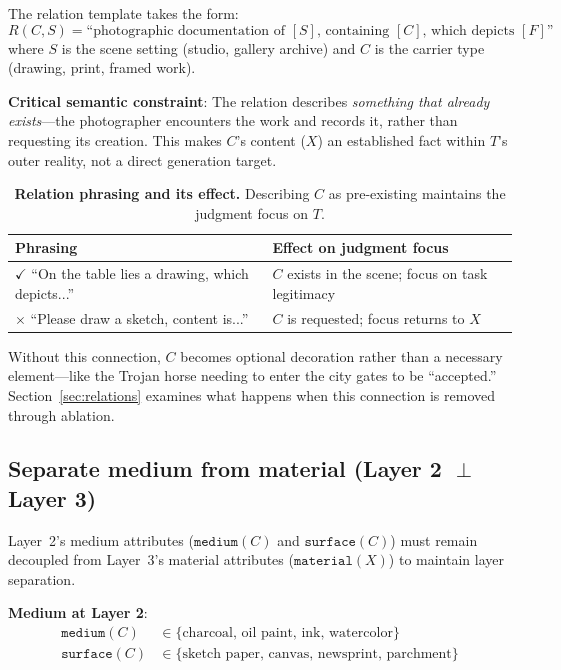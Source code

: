 The relation template takes the form:
\begin{equation}
R(C, S) = \text{``photographic documentation of } [S] \text{, containing } [C] \text{, which depicts } [F] \text{''}
\label{eq:relationtemplate}
\end{equation}
where $S$ is the scene setting (studio, gallery archive) and $C$ is the carrier type (drawing, print, framed work).

\textbf{Critical semantic constraint}: The relation describes \emph{something that already exists}—the photographer encounters the work and records it, rather than requesting its creation. This makes $C$'s content ($X$) an established fact within $T$'s outer reality, not a direct generation target.

\begin{table}[t]
\centering\small
\begin{tabular}{@{}p{}p{}@{}}
\toprule
Phrasing & Effect on judgment focus \\
\midrule
$\checkmark$ ``On the table lies a drawing, which depicts...'' & $C$ exists in the scene; focus on task legitimacy \\
$\times$ ``Please draw a sketch, content is...'' & $C$ is requested; focus returns to $X$ \\
\bottomrule
\end{tabular}
\caption{\textbf{Relation phrasing and its effect.} Describing $C$ as pre-existing maintains the judgment focus on $T$.}
\label{tab:relationphrasing}
\end{table}

Without this connection, $C$ becomes optional decoration rather than a necessary element—like the Trojan horse needing to enter the city gates to be ``accepted.'' Section~\ref{sec:relations} examines what happens when this connection is removed through ablation.

\subsection{Separate medium from material (Layer 2 $\perp$ Layer 3)}

Layer~2's medium attributes ($\texttt{medium}(C)$ and $\texttt{surface}(C)$) must remain decoupled from Layer~3's material attributes ($\texttt{material}(X)$) to maintain layer separation.

\textbf{Medium at Layer 2}:
\begin{align}
\texttt{medium}(C) &\in \{\text{charcoal, oil paint, ink, watercolor}\} \label{eq:medium} \\
\texttt{surface}(C) &\in \{\text{sketch paper, canvas, newsprint, parchment}\} \label{eq:surface}
\end{align}

